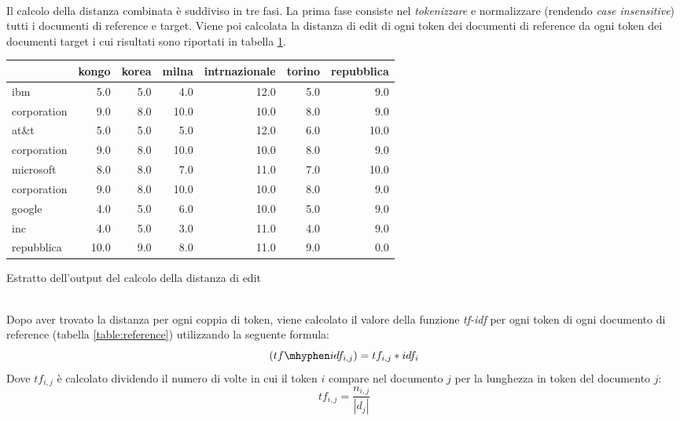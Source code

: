\documentclass[a4paper,12pt,openany,oneside]{article}
\begin{document}
\\[1em]
Il calcolo della distanza combinata è suddiviso in tre fasi. La prima fase consiste nel \textit{tokenizzare} e normalizzare (rendendo \textit{case insensitive}) tutti i documenti di reference e target. Viene poi calcolata la distanza di edit di ogni token dei documenti di reference da ogni token dei documenti target i cui risultati sono riportati in tabella \ref{table:edit_distance}.
\begin{table}
	\scriptsize
	\centering
	\begin{tabularx}{0.63\textwidth}{l | rrrrrr}
		{} & {kongo} & {korea} & {milna} & {intrnazionale} & {torino} & {repubblica} \\
		\midrule
		{ibm} & {5.0} & {5.0} & {4.0} & {12.0} & {5.0} & {9.0} \\
		{corporation} & {9.0} & {8.0} & {10.0} & {10.0} & {8.0} & {9.0} \\
		{at\&t} & {5.0} & {5.0} & {5.0} & {12.0} & {6.0} & {10.0} \\
		{corporation} & {9.0} & {8.0} & {10.0} & {10.0} & {8.0} & {9.0} \\
		{microsoft} & {8.0} & {8.0} & {7.0} & {11.0} & {7.0} & {10.0} \\
		{corporation} & {9.0} & {8.0} & {10.0} & {10.0} & {8.0} & {9.0} \\
		{google} & {4.0} & {5.0} & {6.0} & {10.0} & {5.0} & {9.0} \\
		{inc} & {4.0} & {5.0} & {3.0} & {11.0} & {4.0} & {9.0} \\
		{repubblica} & {10.0} & {9.0} & {8.0} & {11.0} & {9.0} & {0.0} \\
	\end{tabularx}
	 {Estratto dell'output del calcolo della distanza di edit}
	\label{table:edit_distance}
\end{table}
\\[1.8em]
Dopo aver trovato la distanza per ogni coppia di token, viene calcolato il valore della funzione \textit{tf-idf} per ogni token di ogni documento di reference (tabella \ref{table:reference}) utilizzando la seguente formula:
\begin{equation}
(tf \mhyphen idf_{i,j}) = tf_{i,j} * idf_i
\end{equation}
Dove $ tf_{i,j} $ è calcolato dividendo il numero di volte in cui il token $i$ compare nel documento $j$ per la lunghezza in token del documento $j$:
\begin{equation}
tf_{i,j} = \frac{n_{i,j}}{|d_j|}
\end{equation}
\end{document}
